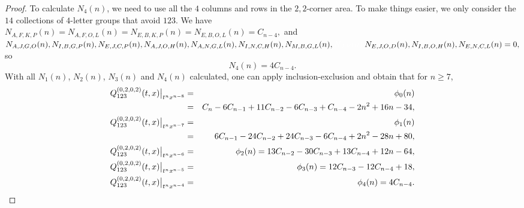 \documentclass[
final,nomarks
]{dmtcs-episciences}
\newcommand{\Qm}[1]{Q_{123}^{(#1)}(t,x)}
\begin{document}
\begin{proof}
	To calculate \begin{math}N_4(n)\end{math}, we need to use all the \begin{math}4\end{math} columns and rows in the \begin{math}2,2\end{math}-corner area. To make things easier, we only consider the \begin{math}14\end{math} collections of \begin{math}4\end{math}-letter groups that avoid \begin{math}123\end{math}. We have\\
	\begin{math}N_{A,F,K,P}(n)=N_{A,F,O,L}(n)=N_{E,B,K,P}(n)=N_{E,B,O,L}(n)=C_{n-4},\end{math} and\\
	\begin{math}N_{A,J,G,O}(n),N_{I,B,G,P}(n),N_{E,J,C,P}(n),N_{A,J,O,H}(n),N_{A,N,G,L}(n),N_{I,N,C,H}(n),N_{M,B,G,L}(n),\\
	{\color{white}N_{J,E}(n),}N_{E,J,O,D}(n),N_{I,B,O,H}(n),N_{E,N,C,L}(n)=0,\end{math} so
	\begin{equation}
		N_4(n)=4C_{n-4}.
	\end{equation}
	With all \begin{math}N_1(n)\end{math}, \begin{math}N_2(n)\end{math}, \begin{math}N_3(n)\end{math} and \begin{math}N_4(n)\end{math} calculated, one can apply inclusion-exclusion and obtain that for \begin{math}n\geq 7\end{math},
	\begin{eqnarray}
		\Qm{0,2,0,2}\big|_{t^n x^{n-8}}&=&\phi_0(n)\nonumber\\
		&=&C_n-6C_{n-1}+11C_{n-2}-6C_{n-3}+C_{n-4}-2n^2+16n-34,\\
		\Qm{0,2,0,2}\big|_{t^n x^{n-7}}&=&\phi_1(n)\nonumber\\
		&=&6C_{n-1}-24C_{n-2}+24C_{n-3}-6C_{n-4}+2n^2-28n+80,\\
		\Qm{0,2,0,2}\big|_{t^n x^{n-6}}&=&\phi_2(n)=13C_{n-2}-30C_{n-3}+13C_{n-4}+12n-64,\\
		\Qm{0,2,0,2}\big|_{t^n x^{n-5}}&=&\phi_3(n)=12C_{n-3}-12C_{n-4}+18,\\
		\Qm{0,2,0,2}\big|_{t^n x^{n-4}}&=&\phi_4(n)=4C_{n-4}. \qedhere
	\end{eqnarray}
\end{proof}
\end{document}

